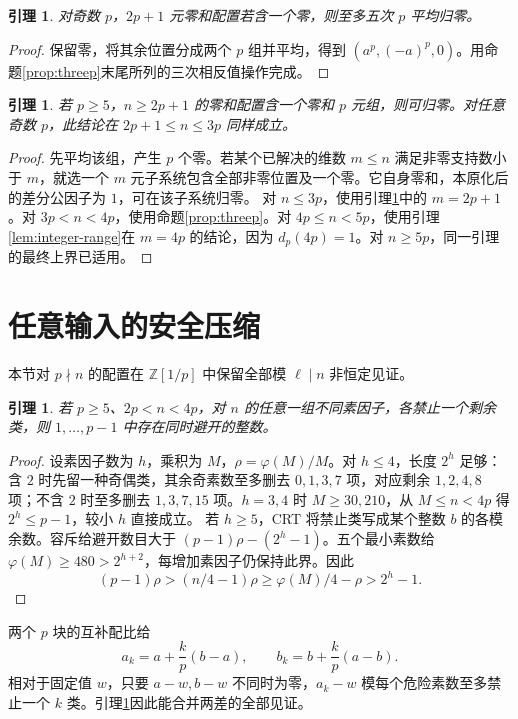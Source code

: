 \documentclass[11pt,a4paper]{article}
\newcommand{\Z}{\mathbb Z}
\newtheorem{lemma}[theorem]{引理}
\theoremstyle{definition}
\numberwithin{equation}{section}
\begin{document}
\begin{lemma}\label{lem:zero-base}
对奇数 $p$，$2p+1$ 元零和配置若含一个零，则至多五次 $p$ 平均归零。
\end{lemma}
\begin{proof}
保留零，将其余位置分成两个 $p$ 组并平均，得到 $(a^p,(-a)^p,0)$。用命题\ref{prop:threep}末尾所列的三次相反值操作完成。
\end{proof}

\begin{lemma}\label{lem:zero-tail}
若 $p\ge5$，$n\ge2p+1$ 的零和配置含一个零和 $p$ 元组，则可归零。对任意奇数 $p$，此结论在 $2p+1\le n\le3p$ 同样成立。
\end{lemma}
\begin{proof}
先平均该组，产生 $p$ 个零。若某个已解决的维数 $m\le n$ 满足非零支持数小于 $m$，就选一个 $m$ 元子系统包含全部非零位置及一个零。它自身零和，本原化后的差分公因子为 $1$，可在该子系统归零。
对 $n\le3p$，使用引理\ref{lem:zero-base}中的 $m=2p+1$。对 $3p<n<4p$，使用命题\ref{prop:threep}。对 $4p\le n<5p$，使用引理\ref{lem:integer-range}在 $m=4p$ 的结论，因为 $d_p(4p)=1$。对 $n\ge5p$，同一引理的最终上界已适用。
\end{proof}


\section{任意输入的安全压缩}
本节对 $p\nmid n$ 的配置在 $\Z[1/p]$ 中保留全部模 $\ell\mid n$ 非恒定见证。

\begin{lemma}\label{lem:short-choice}
若 $p\ge5$、$2p<n<4p$，对 $n$ 的任意一组不同素因子，各禁止一个剩余类，则 $1,\ldots,p-1$ 中存在同时避开的整数。
\end{lemma}
\begin{proof}
设素因子数为 $h$，乘积为 $M$，$\rho=\varphi(M)/M$。对 $h\le4$，长度 $2^h$ 足够：含 $2$ 时先留一种奇偶类，其余奇素数至多删去 $0,1,3,7$ 项，对应剩余 $1,2,4,8$ 项；不含 $2$ 时至多删去 $1,3,7,15$ 项。$h=3,4$ 时 $M\ge30,210$，从 $M\le n<4p$ 得 $2^h\le p-1$，较小 $h$ 直接成立。
若 $h\ge5$，CRT 将禁止类写成某个整数 $b$ 的各模余数。容斥给避开数目大于 $(p-1)\rho-(2^h-1)$。五个最小素数给 $\varphi(M)\ge480>2^{h+2}$，每增加素因子仍保持此界。因此
\[(p-1)\rho>(n/4-1)\rho\ge\varphi(M)/4-\rho>2^h-1.
\]
\end{proof}

两个 $p$ 块的互补配比给
\begin{equation}\label{eq:mix-pair}
a_k=a+\frac{k}{p}(b-a),\qquad b_k=b+\frac{k}{p}(a-b).
\end{equation}
相对于固定值 $w$，只要 $a-w,b-w$ 不同时为零，$a_k-w$ 模每个危险素数至多禁止一个 $k$ 类。引理\ref{lem:short-choice}因此能合并两差的全部见证。
\end{document}
